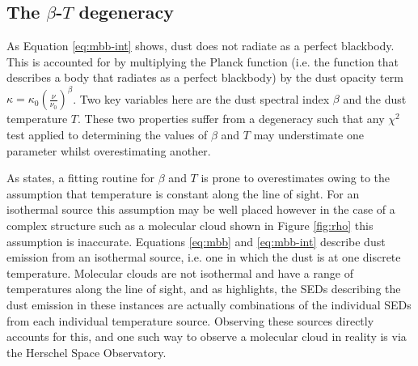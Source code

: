 \documentclass{report}
\begin{document}
\subsection{The $\beta$-$T$ degeneracy} \label{sec:degen}
As Equation \ref{eq:mbb-int} shows, dust does not radiate as a perfect blackbody. This is accounted for by multiplying the Planck function (i.e. the function that describes a body that radiates as a perfect blackbody) by the dust opacity term $\kappa = \kappa_{0}(\frac{\nu}{\nu_{0}})^{\beta}$. Two key variables here are the dust spectral index $\beta$ and the dust temperature $T$. These two properties suffer from a degeneracy \parencite{degen} such that any $\chi^{2}$ test applied to determining the values of $\beta$ and $T$ may understimate one parameter whilst overestimating another.

As \textcite{noise} states, a fitting routine for $\beta$ and $T$ is prone to overestimates owing to the assumption that temperature is constant along the line of sight. For an isothermal source this assumption may be well placed however in the case of a complex structure such as a molecular cloud shown in Figure \ref{fig:rho} this assumption is inaccurate. Equations \ref{eq:mbb} and \ref{eq:mbb-int} describe dust emission from an isothermal source, i.e. one in which the dust is at one discrete temperature. Molecular clouds are not isothermal and have a range of temperatures along the line of sight, and as \textcite{noise} highlights, the SEDs describing the dust emission in these instances are actually combinations of the individual SEDs from each individual temperature source. Observing these sources directly accounts for this, and one such way to observe a molecular cloud in reality is via the Herschel Space Observatory.
\end{document}
